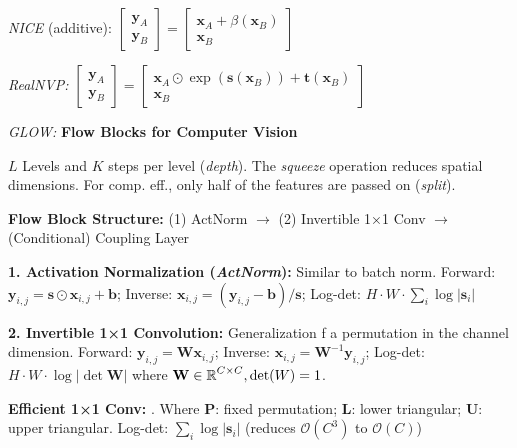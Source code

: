 
\emph{NICE} (additive):
$\begin{bmatrix} \mathbf{y}_A \\ \mathbf{y}_B \end{bmatrix} = \begin{bmatrix} \mathbf{x}_A + \beta(\mathbf{x}_B) \\ \mathbf{x}_B \end{bmatrix}$

\emph{RealNVP:}
$\begin{bmatrix} \mathbf{y}_A \\ \mathbf{y}_B \end{bmatrix} = \begin{bmatrix} \mathbf{x}_A \odot \exp(\mathbf{s}(\mathbf{x}_B)) + \mathbf{t}(\mathbf{x}_B) \\ \mathbf{x}_B \end{bmatrix}$

\emph{GLOW:} \textbf{Flow Blocks for Computer Vision}

$L$ Levels and $K$ steps per level (\textit{depth}). The \textit{squeeze} operation reduces spatial
dimensions. For comp. eff., only half of the
features are passed on (\textit{split}).

\textbf{Flow Block Structure:} (1) ActNorm $\rightarrow$ (2) Invertible 1×1 Conv $\rightarrow$ (Conditional) Coupling Layer

\textbf{1. Activation Normalization (\emph{ActNorm}):} Similar to batch norm. Forward: $\mathbf{y}_{i,j} = \mathbf{s} \odot \mathbf{x}_{i,j} + \mathbf{b}$; Inverse: $\mathbf{x}_{i,j} = (\mathbf{y}_{i,j} - \mathbf{b}) / \mathbf{s}$; Log-det: $H \cdot W \cdot \sum_i \log |\mathbf{s}_i|$

\textbf{2. Invertible 1×1 Convolution:} Generalization f a permutation in the channel dimension. Forward: $\mathbf{y}_{i,j} = \mathbf{W}\mathbf{x}_{i,j}$; Inverse: $\mathbf{x}_{i,j} = \mathbf{W}^{-1}\mathbf{y}_{i,j}$; Log-det: $H \cdot W \cdot \log |\det \mathbf{W}|$ where $\mathbf{W} \in \operatorname{\mathbb{R}}^{C \times C}, \det(W)=1$.

\textbf{Efficient 1×1 Conv:} . Where $\mathbf{P}$: fixed permutation; $\mathbf{L}$: lower triangular; $\mathbf{U}$: upper triangular. Log-det: $\sum_i \log |\mathbf{s}_i|$ (reduces $\mathcal{O}(C^3)$ to $\mathcal{O}(C)$)

